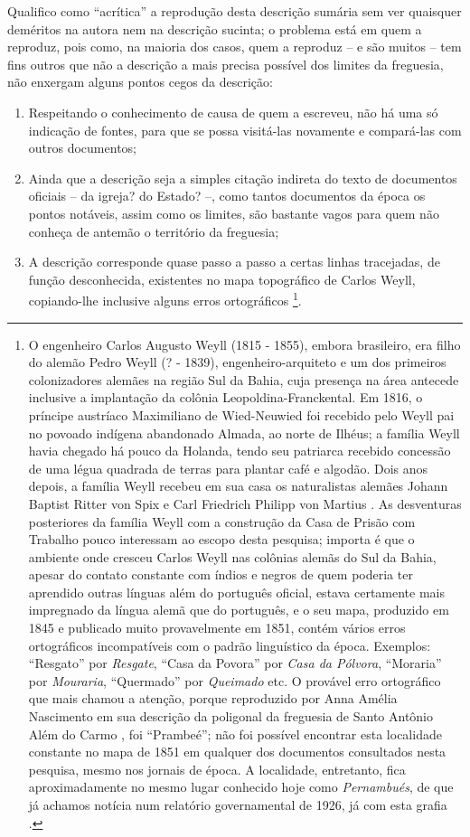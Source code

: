 Qualifico como ``acrítica'' a reprodução desta descrição sumária sem ver quaisquer deméritos na autora nem na descrição sucinta; o problema está em quem a reproduz, pois como, na maioria dos casos, quem a reproduz -- e são muitos -- tem fins outros que não a descrição a mais precisa possível dos limites da freguesia, não enxergam alguns pontos cegos da descrição:
\begin{enumerate}
\item Respeitando o conhecimento de causa de quem a escreveu, não há uma só indicação de fontes, para que se possa visitá-las novamente e compará-las com outros documentos;
\item Ainda que a descrição seja a simples citação indireta do texto de documentos oficiais -- da igreja? do Estado? --, como tantos documentos da época os pontos notáveis, assim como os limites, são bastante vagos para quem não conheça de antemão o território da freguesia;
\item A descrição corresponde quase passo a passo a certas linhas tracejadas, de função desconhecida, existentes no mapa topográfico de Carlos Weyll, copiando-lhe inclusive alguns erros ortográficos \cite{weyll_mappa_1851}\footnote{O engenheiro Carlos Augusto Weyll (1815 - 1855), embora brasileiro, era filho do alemão Pedro Weyll (? - 1839), engenheiro-arquiteto e um dos primeiros colonizadores alemães na região Sul da Bahia, cuja presença na área antecede inclusive a implantação da colônia Leopoldina-Franckental. Em 1816, o príncipe austríaco Maximiliano de Wied-Neuwied foi recebido pelo Weyll pai no povoado indígena abandonado Almada, ao norte de Ilhéus; a família Weyll havia chegado há pouco da Holanda, tendo seu patriarca recebido concessão de uma légua quadrada de terras para plantar café e algodão. Dois anos depois, a família Weyll recebeu em sua casa os naturalistas alemães Johann Baptist Ritter von Spix e Carl Friedrich Philipp von Martius \cite[pp.~458-460]{oberacker_leopoldina_1972}. As desventuras posteriores da família Weyll com a construção da Casa de Prisão com Trabalho pouco interessam ao escopo desta pesquisa; importa é que o ambiente onde cresceu Carlos Weyll nas colônias alemãs do Sul da Bahia, apesar do contato constante com índios e negros de quem poderia ter aprendido outras línguas além do português oficial, estava certamente mais impregnado da língua alemã que do português, e o seu mapa, produzido em 1845 \cite[p.~31]{bahia_rpe_1846} e publicado muito provavelmente em 1851, contém vários erros ortográficos incompatíveis com o padrão linguístico da época. Exemplos: ``Resgato'' por \textit{Resgate}, ``Casa da Povora'' por \textit{Casa da Pólvora}, ``Moraria'' por \textit{Mouraria}, ``Quermado'' por \textit{Queimado} etc. O provável erro ortográfico que mais chamou a atenção, porque reproduzido por Anna Amélia Nascimento em sua descrição da poligonal da freguesia de Santo Antônio Além do Carmo \cite[p.~55]{NASCIMENTO2007}, foi ``Prambeé''; não foi possível encontrar esta localidade constante no mapa de 1851 em qualquer dos documentos consultados nesta pesquisa, mesmo nos jornais de época. A localidade, entretanto, fica aproximadamente no mesmo lugar conhecido hoje como \textit{Pernambués}, de que já achamos notícia num relatório governamental de 1926, já com esta grafia \cite[p.~185]{bahia_rpe_1926}.}.

\end{enumerate}

